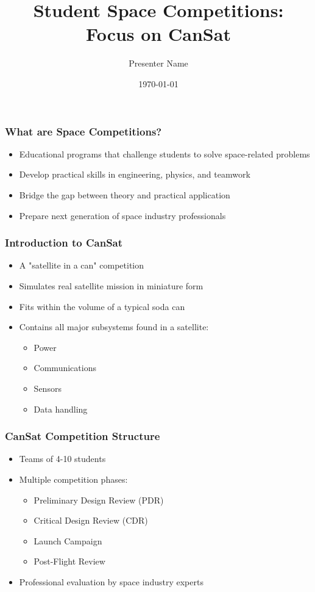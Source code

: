 \documentclass{beamer}
\title{Student Space Competitions:\\Focus on CanSat}
\author{Presenter Name}
\date{\today}
\begin{document}
\begin{frame}
\titlepage
\end{frame}

\begin{frame}
\frametitle{What are Space Competitions?}
\begin{itemize}
\item Educational programs that challenge students to solve space-related problems
\item Develop practical skills in engineering, physics, and teamwork
\item Bridge the gap between theory and practical application
\item Prepare next generation of space industry professionals
\end{itemize}
\end{frame}

\begin{frame}
\frametitle{Introduction to CanSat}
\begin{itemize}
\item A "satellite in a can" competition
\item Simulates real satellite mission in miniature form
\item Fits within the volume of a typical soda can
\item Contains all major subsystems found in a satellite:
    \begin{itemize}
    \item Power
    \item Communications
    \item Sensors
    \item Data handling
    \end{itemize}
\end{itemize}
\end{frame}

\begin{frame}
\frametitle{CanSat Competition Structure}
\begin{itemize}
\item Teams of 4-10 students
\item Multiple competition phases:
    \begin{itemize}
    \item Preliminary Design Review (PDR)
    \item Critical Design Review (CDR)
    \item Launch Campaign
    \item Post-Flight Review
    \end{itemize}
\item Professional evaluation by space industry experts
\end{itemize}
\end{frame}
\end{document}
